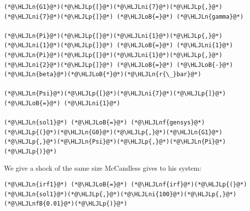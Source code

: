 \documentclass[12pt,a4paper]{article}
\newcommand{\HLJLn}[1]{#1}
\newcommand{\HLJLnf}[1]{\textcolor[RGB]{66,102,213}{#1}}
\newcommand{\HLJLnfB}[1]{\textcolor[RGB]{59,151,46}{#1}}
\newcommand{\HLJLni}[1]{\textcolor[RGB]{59,151,46}{#1}}
\newcommand{\HLJLoB}[1]{\textcolor[RGB]{102,102,102}{\textbf{#1}}}
\newcommand{\HLJLp}[1]{#1}
\begin{document}
\begin{lstlisting}
(*@\HLJLn{G1}@*)(*@\HLJLp{[}@*)(*@\HLJLni{7}@*)(*@\HLJLp{,}@*)(*@\HLJLni{7}@*)(*@\HLJLp{]}@*) (*@\HLJLoB{=}@*) (*@\HLJLn{gamma}@*)

(*@\HLJLn{Pi}@*)(*@\HLJLp{[}@*)(*@\HLJLni{1}@*)(*@\HLJLp{,}@*)(*@\HLJLni{1}@*)(*@\HLJLp{]}@*) (*@\HLJLoB{=}@*) (*@\HLJLni{1}@*)
(*@\HLJLn{Pi}@*)(*@\HLJLp{[}@*)(*@\HLJLni{1}@*)(*@\HLJLp{,}@*)(*@\HLJLni{2}@*)(*@\HLJLp{]}@*) (*@\HLJLoB{=}@*) (*@\HLJLoB{-}@*)(*@\HLJLn{beta}@*)(*@\HLJLoB{*}@*)(*@\HLJLn{r{\_}bar}@*)

(*@\HLJLn{Psi}@*)(*@\HLJLp{[}@*)(*@\HLJLni{7}@*)(*@\HLJLp{]}@*) (*@\HLJLoB{=}@*) (*@\HLJLni{1}@*)

(*@\HLJLn{sol1}@*) (*@\HLJLoB{=}@*) (*@\HLJLnf{gensys}@*)(*@\HLJLp{(}@*)(*@\HLJLn{G0}@*)(*@\HLJLp{,}@*)(*@\HLJLn{G1}@*)(*@\HLJLp{,}@*)(*@\HLJLn{Psi}@*)(*@\HLJLp{,}@*)(*@\HLJLn{Pi}@*)(*@\HLJLp{)}@*)
\end{lstlisting}


We give a shock of the same size McCandless gives to his system:


\begin{lstlisting}
(*@\HLJLn{irf1}@*) (*@\HLJLoB{=}@*) (*@\HLJLnf{irf}@*)(*@\HLJLp{(}@*)(*@\HLJLn{sol1}@*)(*@\HLJLp{,}@*)(*@\HLJLni{100}@*)(*@\HLJLp{,}@*)(*@\HLJLnfB{0.01}@*)(*@\HLJLp{)}@*)
\end{lstlisting}
\end{document}
